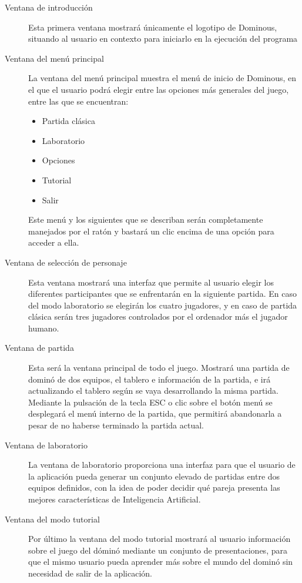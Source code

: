 \begin{description}
    \item[Ventana de introducción] Esta primera ventana mostrará únicamente el logotipo de Dominous, situando al usuario
            en contexto para iniciarlo en la ejecución del programa
    \item[Ventana del menú principal] La ventana del menú principal muestra el menú de inicio de Dominous, en el que
            el usuario podrá elegir entre las opciones más generales del juego, entre las que se encuentran:
            \begin{itemize}
                \item Partida clásica
                \item Laboratorio
                \item Opciones
                \item Tutorial
                \item Salir
            \end{itemize}
            Este menú y los siguientes que se describan serán completamente manejados por el ratón y bastará
            un clic encima de una opción para acceder a ella.
    \item[Ventana de selección de personaje] Esta ventana mostrará una interfaz que permite al usuario elegir los
            diferentes participantes que se enfrentarán en la siguiente partida. En caso del modo laboratorio
            se elegirán los cuatro jugadores, y en caso de partida clásica serán tres jugadores controlados por
            el ordenador más el jugador humano.
    \item[Ventana de partida] Esta será la ventana principal de todo el juego. Mostrará una partida de dominó
            de dos equipos, el tablero e información de la partida, e irá actualizando el tablero según se vaya
            desarrollando la misma partida. Mediante la pulsación de la tecla ESC o clic sobre el botón menú se
            desplegará el menú interno de la partida, que permitirá abandonarla a pesar de no haberse terminado
            la partida actual.
    \item[Ventana de laboratorio] La ventana de laboratorio proporciona una interfaz para que el usuario de la
            aplicación pueda generar un conjunto elevado de partidas entre dos equipos definidos, con la idea
            de poder decidir qué pareja presenta las mejores características de Inteligencia Artificial.
    \item[Ventana del modo tutorial] Por último la ventana del modo tutorial mostrará al usuario información sobre
            el juego del dóminó mediante un conjunto de presentaciones, para que el mismo usuario pueda aprender
            más sobre el mundo del dominó sin necesidad de salir de la aplicación.
\end{description}


